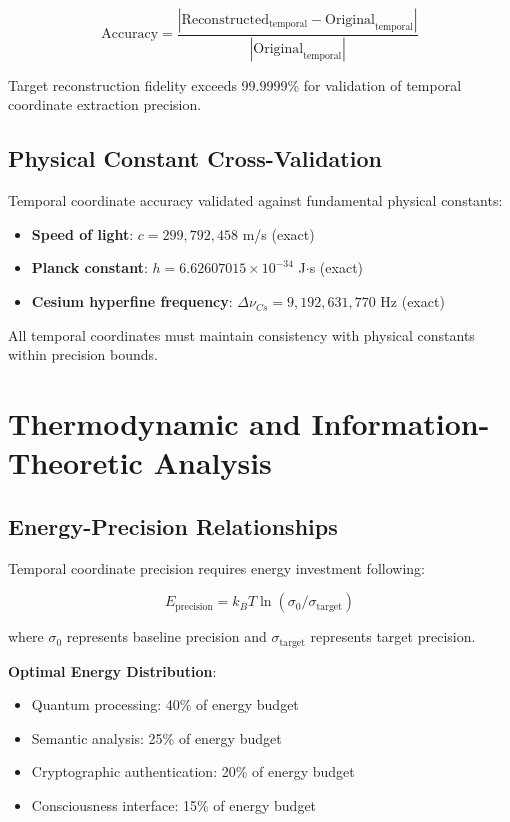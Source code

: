 \documentclass[11pt]{article}
\theoremstyle{remark}
\begin{document}
$$\text{Accuracy} = \frac{|\text{Reconstructed}_{\text{temporal}} - \text{Original}_{\text{temporal}}|}{|\text{Original}_{\text{temporal}}|}$$

Target reconstruction fidelity exceeds 99.9999\% for validation of temporal coordinate extraction precision.

\subsection{Physical Constant Cross-Validation}

Temporal coordinate accuracy validated against fundamental physical constants:

\begin{itemize}
\item \textbf{Speed of light}: $c = 299,792,458$ m/s (exact)
\item \textbf{Planck constant}: $h = 6.62607015 \times 10^{-34}$ J$\cdot$s (exact)
\item \textbf{Cesium hyperfine frequency}: $\Delta \nu_{Cs} = 9,192,631,770$ Hz (exact)
\end{itemize}

All temporal coordinates must maintain consistency with physical constants within precision bounds.

\section{Thermodynamic and Information-Theoretic Analysis}

\subsection{Energy-Precision Relationships}

Temporal coordinate precision requires energy investment following:

$$E_{\text{precision}} = k_B T \ln(\sigma_0/\sigma_{\text{target}})$$

where $\sigma_0$ represents baseline precision and $\sigma_{\text{target}}$ represents target precision.

\textbf{Optimal Energy Distribution}:
\begin{itemize}
\item Quantum processing: 40\% of energy budget
\item Semantic analysis: 25\% of energy budget
\item Cryptographic authentication: 20\% of energy budget
\item Consciousness interface: 15\% of energy budget
\end{itemize}
\end{document}
